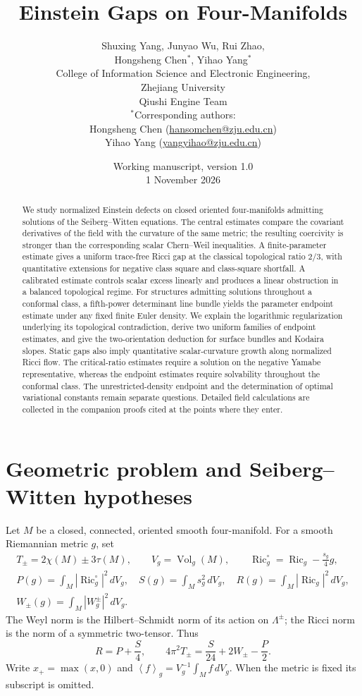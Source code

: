 \documentclass[11pt,a4paper]{article}
\title{Einstein Gaps on Four-Manifolds}
\author{\normalsize Shuxing Yang, Junyao Wu, Rui Zhao,\\[3pt]
\normalsize Hongsheng Chen$^{*}$, Yihao Yang$^{*}$\\[9pt]
\small College of Information Science and Electronic Engineering,\\
\small Zhejiang University\\
\small Qiushi Engine Team\\[8pt]
\footnotesize $^{*}$Corresponding authors:\\
\footnotesize Hongsheng Chen (\href{mailto:hansomchen@zju.edu.cn}{hansomchen@zju.edu.cn})\\
\footnotesize Yihao Yang (\href{mailto:yangyihao@zju.edu.cn}{yangyihao@zju.edu.cn})}
\date{\small Working manuscript, version 1.0\\1 November 2026}
\theoremstyle{definition}
\theoremstyle{remark}
\newcommand{\Ric}{\operatorname{Ric}}
\newcommand{\Vol}{\operatorname{Vol}}
\newcommand{\av}[1]{\left\langle#1\right\rangle}
\begin{document}
\maketitle
\begin{abstract}
We study normalized Einstein defects on closed oriented four-manifolds admitting solutions of the Seiberg--Witten equations. The central estimates compare the covariant derivatives of the field with the curvature of the same metric; the resulting coercivity is stronger than the corresponding scalar Chern--Weil inequalities. A finite-parameter estimate gives a uniform trace-free Ricci gap at the classical topological ratio $2/3$, with quantitative extensions for negative class square and class-square shortfall. A calibrated estimate controls scalar excess linearly and produces a linear obstruction in a balanced topological regime. For structures admitting solutions throughout a conformal class, a fifth-power determinant line bundle yields the parameter endpoint estimate under any fixed finite Euler density. We explain the logarithmic regularization underlying its topological contradiction, derive two uniform families of endpoint estimates, and give the two-orientation deduction for surface bundles and Kodaira slopes. Static gaps also imply quantitative scalar-curvature growth along normalized Ricci flow. The critical-ratio estimates require a solution on the negative Yamabe representative, whereas the endpoint estimates require solvability throughout the conformal class. The unrestricted-density endpoint and the determination of optimal variational constants remain separate questions. Detailed field calculations are collected in the companion proofs cited at the points where they enter.
\end{abstract}
\tableofcontents

\section{Geometric problem and Seiberg--Witten hypotheses}
Let $M$ be a closed, connected, oriented smooth four-manifold. For a smooth Riemannian metric $g$, set
\begin{gather}
 T_\pm=2\chi(M)\pm3\tau(M),\qquad V_g=\Vol_g(M),\qquad
 \Ric^\circ_g=\Ric_g-\frac{s_g}{4}g,\label{eq:notation}\\
 P(g)=\int_M|\Ric^\circ_g|^2\,dV_g,\quad
 S(g)=\int_Ms_g^2\,dV_g,\quad
 R(g)=\int_M|\Ric_g|^2\,dV_g,\label{eq:energydefs}\\
 W_\pm(g)=\int_M|W_g^\pm|^2\,dV_g.\nonumber
\end{gather}
The Weyl norm is the Hilbert--Schmidt norm of its action on $\Lambda^\pm$; the Ricci norm is the norm of a symmetric two-tensor. Thus
\begin{equation}
 R=P+\frac S4,\qquad
 4\pi^2T_\pm=\frac S{24}+2W_\pm-\frac P2.
 \label{eq:CW}
\end{equation}
Write $x_+=\max(x,0)$ and $\av{f}_g=V_g^{-1}\int_Mf\,dV_g$. When the metric is fixed its subscript is omitted.
\end{document}
